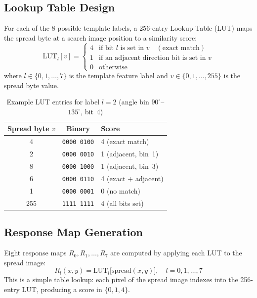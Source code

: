 \documentclass[12pt,a4paper]{article}
\begin{document}
\subsection{Lookup Table Design}
For each of the 8 possible template labels, a 256-entry Lookup Table (LUT) maps the
spread byte at a search image position to a similarity score:
\begin{equation}
  \text{LUT}_l[v] =
  \begin{cases}
    4 & \text{if bit } l \text{ is set in } v \quad (\text{exact match}) \\
    1 & \text{if an adjacent direction bit is set in } v \\
    0 & \text{otherwise}
  \end{cases}
\end{equation}
where $l \in \{0,1,\ldots,7\}$ is the template feature label and
$v \in \{0,1,\ldots,255\}$ is the spread byte value.

\begin{table}[H]
  \centering
  \caption{Example LUT entries for label $l = 2$
           (angle bin $90^\circ$--$135^\circ$, bit~4)}
  \label{tab:lut}
  \begin{tabular}{ccl}
    \toprule
    \textbf{Spread byte $v$} & \textbf{Binary}          & \textbf{Score} \\
    \midrule
    4   & \texttt{0000\,0100} & 4 (exact match)          \\
    2   & \texttt{0000\,0010} & 1 (adjacent, bin~1)      \\
    8   & \texttt{0000\,1000} & 1 (adjacent, bin~3)      \\
    6   & \texttt{0000\,0110} & 4 (exact $+$ adjacent)   \\
    1   & \texttt{0000\,0001} & 0 (no match)             \\
    255 & \texttt{1111\,1111} & 4 (all bits set)         \\
    \bottomrule
  \end{tabular}
\end{table}

\subsection{Response Map Generation}
Eight response maps $R_0, R_1, \ldots, R_7$ are computed by applying each LUT to the
spread image:
\begin{equation}
  R_l(x,y) = \text{LUT}_l\bigl[\text{spread}(x,y)\bigr],
  \quad l = 0, 1, \ldots, 7
\end{equation}
This is a simple table lookup: each pixel of the spread image indexes into the
256-entry LUT, producing a score in $\{0, 1, 4\}$.
\end{document}
